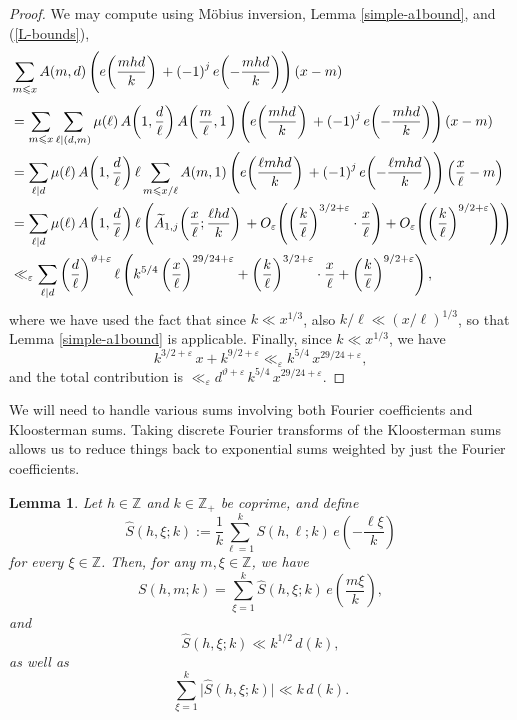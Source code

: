 \documentclass[a4paper,10pt,twoside]{amsart}
\newtheorem{lemma}[theorem]{Lemma}
\theoremstyle{definition}
\numberwithin{equation}{section}
\newcommand\eps{\varepsilon}
\renewcommand\:{\colon}
\begin{document}
\begin{proof}
We may compute using M\"obius inversion, Lemma \ref{simple-a1bound}, and (\ref{L-bounds}),
\begin{align*}
&\sum_{m\leqslant x}A(m,d)\left(e\!\left(\frac{mhd}k\right)\vphantom{\Bigg|}+\left(-1\right)^je\!\left(-\frac{mhd}k\right)\right)\left(x-m\right)\\
&=\sum_{m\leqslant x}\sum_{\ell\mid\left(d,m\right)}\mu\!\left(\ell\right)A\!\left(1,\frac d\ell\right)A\!\left(\frac{m\vphantom d}\ell,1\right)\left(e\!\left(\frac{mhd}k\right)\vphantom{\Bigg|}+\left(-1\right)^je\!\left(-\frac{mhd}k\right)\right)\left(x-m\right)\\
&=\sum_{\ell\mid d}\mu\!\left(\ell\right)A\!\left(1,\frac d\ell\right)\ell\sum_{m\leqslant x/\ell}A\!\left(m,1\right)\left(e\!\left(\frac{\ell mhd}{k}\right)\vphantom{\Bigg|}+\left(-1\right)^je\!\left(-\frac{\ell mhd}{k}\right)\right)\left(\frac x\ell-m\right)\\
&=\sum_{\ell\mid d}\mu\!\left(\ell\right)A\!\left(1,\frac d\ell\right)\ell\left(\widetilde A_{1,j}\!\left(\frac x\ell;\frac{\ell h d}{k}\right)\vphantom{\Bigg|}+O_\eps\!\left(\left(\frac k{\ell}\right)^{3/2+\varepsilon}\cdot\frac x\ell\right)+O_\eps\!\left(\left(\frac k{\ell}\right)^{9/2+\varepsilon}\right)\right)\\
&\ll_\eps\sum_{\ell\mid d}
\left(\frac d\ell\right)^{\vartheta+\varepsilon}\ell
\left(
k^{5/4}\left(\frac{x\vphantom k}\ell\right)^{29/24+\varepsilon}
+\left(\frac k\ell\right)^{3/2+\varepsilon}\cdot\frac x\ell
+\left(\frac{k}\ell\right)^{9/2+\varepsilon}
\right),
\end{align*}
where we have used the fact that since $k\ll x^{1/3}$, also $k/\ell\ll\left(x/\ell\right)^{1/3}$, so that Lemma \ref{simple-a1bound} is applicable. Finally, since $k\ll x^{1/3}$, we have
\[k^{3/2+\varepsilon}\,x+k^{9/2+\varepsilon}\ll_\eps k^{5/4}\,x^{29/24+\varepsilon},\]
and the total contribution is $\ll_\eps d^{\vartheta+\varepsilon}\,k^{5/4}\,x^{29/24+\varepsilon}$.
\end{proof}

\noindent We will need to handle various sums involving both Fourier coefficients and Kloosterman sums. Taking discrete Fourier transforms of the Kloosterman sums allows us to reduce things back to exponential sums weighted by just the Fourier coefficients.
\begin{lemma}\label{kloosterman-fourier}
Let $h\in\mathbb Z$ and $k\in\mathbb Z_+$ be coprime, and define
\[\widehat S(h,\xi;k):=\frac1k\sum_{\ell=1}^kS(h,\ell;k)\,e\!\left(-\frac{\ell\xi}k\right)\]
for every $\xi\in\mathbb Z$. Then, for any $m,\xi\in\mathbb Z$, we have
\[S(h,m;k)=\sum_{\xi=1}^k\widehat S(h,\xi;k)\,e\!\left(\frac{m\xi}k\right),\]
and
\[\widehat S(h,\xi;k)\ll k^{1/2}\,d(k),\]
as well as
\[\sum_{\xi=1}^k\bigl|\widehat S(h,\xi;k)\bigr|\ll k\,d(k).\]
\end{lemma}
\end{document}
